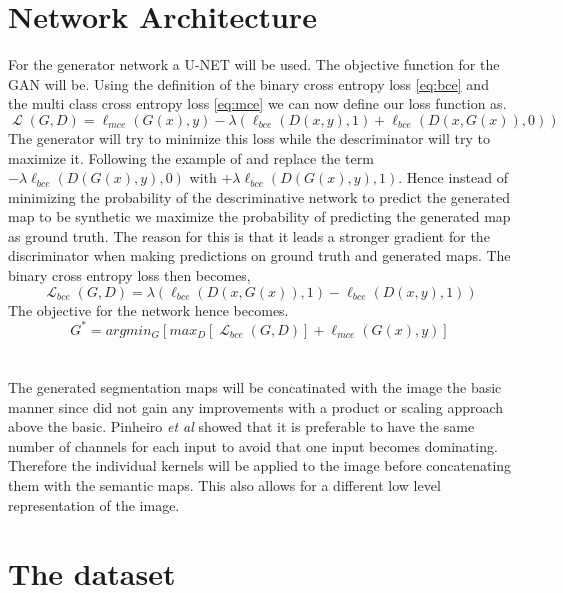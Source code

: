 \documentclass[a4paper,11pt]{article}
\DeclareMathOperator{\Lagr}{\mathcal{L}}
\begin{document}
\section{Network Architecture}
For the generator network a U-NET will be used. The objective function for the GAN will be.  Using the definition of the binary cross entropy loss \eqref{eq:bce} and the multi class cross entropy loss \eqref{eq:mce} we can now define our loss function as.
\begin{equation}
\Lagr(G, D) = \ell_{mce}(G(x),y)-\lambda(\ell_{bce}(D(x,y), 1)+\ell_{bce}(D(x,G(x)), 0))
\end{equation}
The generator will try to minimize this loss while the descriminator will try to maximize it. Following the example of \cite{goodfellow_generative_2014, luc_semantic_2016} and replace the term $-\lambda\ell_{bce}(D(G(x),y), 0)$ with  $+\lambda\ell_{bce}(D(G(x),y), 1)$. Hence instead of minimizing the probability of the descriminative network to predict the generated map to be synthetic we maximize the probability of predicting the generated map as ground truth. The reason for this is that it leads a stronger gradient for the discriminator when making predictions on ground truth and generated maps. The binary cross entropy loss then becomes,
\begin{equation}
\Lagr_{bce}(G, D) =\lambda(\ell_{bce}(D(x,G(x)), 1)-\ell_{bce}(D(x,y), 1))
\end{equation}
The objective for the network hence becomes.
\begin{equation}
G^{*}=argmin_{G}[max_{D}[\Lagr_{bce}(G, D)] + \ell_{mce}(G(x),y)]
\end{equation}
\\
\\
The generated segmentation maps will be concatinated with the image the basic manner since \cite{luc_semantic_2016} did not gain any improvements with a product or scaling approach above the basic. Pinheiro \textit{et al} \cite{pinheiro_learning_2016} showed that it is preferable to have the same number of channels for each input to avoid that one input becomes dominating. Therefore the individual kernels will be applied to the image before concatenating them with the semantic maps. This also allows for a different low level representation of the image.
\section{The dataset}
\end{document}
